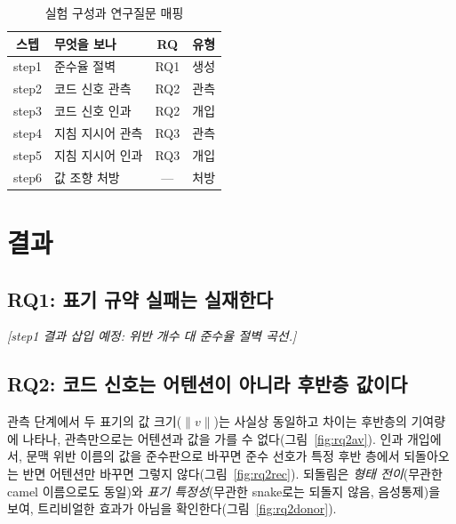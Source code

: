 \documentclass[twocolumn, 10pt]{article}
\begin{document}
\begin{table}[t]
\caption{실험 구성과 연구질문 매핑}
\label{tab:exp}
\begin{center}
\small
\begin{tabular}{c|l|c|c}
\hline
스텝 & 무엇을 보나 & RQ & 유형 \\
\hline
step1 & 준수율 절벽 & RQ1 & 생성 \\
step2 & 코드 신호 관측 & RQ2 & 관측 \\
step3 & 코드 신호 인과 & RQ2 & 개입 \\
step4 & 지침 지시어 관측 & RQ3 & 관측 \\
step5 & 지침 지시어 인과 & RQ3 & 개입 \\
step6 & 값 조향 처방 & --- & 처방 \\
\hline
\end{tabular}
\end{center}
\end{table}

\section{결과}

\subsection{RQ1: 표기 규약 실패는 실재한다}
\emph{[step1 결과 삽입 예정: 위반 개수 대 준수율 절벽 곡선.]}

\subsection{RQ2: 코드 신호는 어텐션이 아니라 후반층 값이다}
관측 단계에서 두 표기의 값 크기(\(\|v\|\))는 사실상 동일하고 차이는 후반층의
기여량에 나타나, 관측만으로는 어텐션과 값을 가를 수 없다(그림~\ref{fig:rq2av}).
인과 개입에서, 문맥 위반 이름의 값을 준수판으로 바꾸면 준수 선호가 특정 후반 층에서
되돌아오는 반면 어텐션만 바꾸면 그렇지 않다(그림~\ref{fig:rq2rec}). 되돌림은
\emph{형태 전이}(무관한 camel 이름으로도 동일)와 \emph{표기 특정성}(무관한 snake로는
되돌지 않음, 음성통제)을 보여, 트리비얼한 효과가 아님을 확인한다(그림~\ref{fig:rq2donor}).
\end{document}
